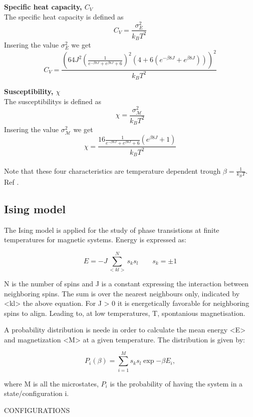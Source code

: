 \documentclass[../main.tex]{subfiles}
\begin{document}
    \textbf{Specific heat capacity, $C_V$}\\
    The specific heat capacity is defined as
    \[C_V = \frac{\sigma_E^2}{k_B T^2}\]
    Insering the value $\sigma^2_E$ we get
      \[C_V = \frac{\left( 64J^2 \left(\frac{1}{e^{-\beta 8J} + e^{\beta 8J} + 6}\right)^2  \left(4 + 6(e^{-\beta 8J} + e^{\beta 8J}) \right)\right)^2}{k_B T^2}\]


    \textbf{Susceptibility, $\chi$}\\
    The susceptibilitys is defined as
    \[\chi = \frac{\sigma^2_\mathcal{M}}{k_B T^2}\]
    Insering the value $\sigma^2_\mathcal{M}$ we get
    \[\chi = \frac{16 \frac{1}{e^{-\beta 8J} + e^{\beta 8J} + 6} \left(e^{\beta 8J} + 1\right)}{k_B T^2}\]\\

    \noindent Note that these four characteristics are temperature dependent trough $\beta = \frac{1}{k_B T}$.\\
    Ref \cite{Mortenstatphys2019}.


    \subsection{Ising model}
    The Ising model is applied for the study of phase transistions at finite temperatures
    for magnetic systems. Energy is expressed as:

    \begin{equation}
      E = -J \sum  _{<kl>}^N s_ks_l \qquad s_k = \pm 1
    \end{equation}

    N is the number of spins and J is a constant expressing the interaction between neighboring spins. The sum is over the nearest neighbours only, indicated by <kl> the above equation. For J > 0 it is energetically favorable for neighboring spins to align. Leading to, at low temperatures, T, spontanious magnetisation.

    A probability distribution is neede in order to calculate the mean energy <E> and magnetization <M> at a given temperature. The distribution is given by:

    \begin{equation}
      P_i(\beta)=  \sum  _{i = 1}^M s_ks_l \exp{-\beta E_i},
    \end{equation}

    where M is all the microstates, $P_i$ is the probability of having the system in a state/configuration i.

    CONFIGURATIONS
\end{document}
